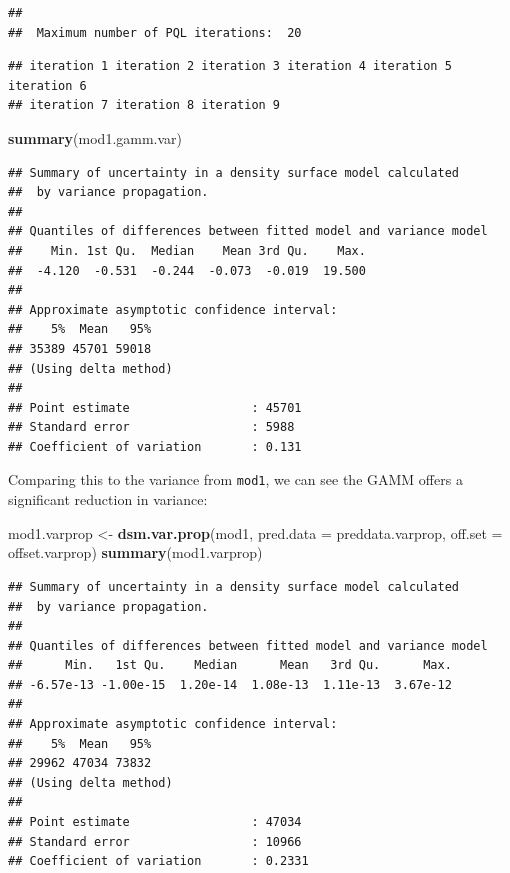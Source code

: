 \documentclass[]{amsart}
\newenvironment{Shaded}{}{}
\newcommand{\KeywordTok}[1]{\textcolor[rgb]{0.00,0.44,0.13}{\textbf{{#1}}}}
\newcommand{\DataTypeTok}[1]{\textcolor[rgb]{0.56,0.13,0.00}{{#1}}}
\newcommand{\StringTok}[1]{\textcolor[rgb]{0.25,0.44,0.63}{{#1}}}
\newcommand{\NormalTok}[1]{{#1}}
\begin{document}
\begin{verbatim}
## 
##  Maximum number of PQL iterations:  20
\end{verbatim}

\begin{verbatim}
## iteration 1 iteration 2 iteration 3 iteration 4 iteration 5 iteration 6
## iteration 7 iteration 8 iteration 9
\end{verbatim}

\begin{Shaded}
\begin{Highlighting}[]
\KeywordTok{summary}\NormalTok{(mod1.gamm.var)}
\end{Highlighting}
\end{Shaded}

\begin{verbatim}
## Summary of uncertainty in a density surface model calculated
##  by variance propagation.
## 
## Quantiles of differences between fitted model and variance model
##    Min. 1st Qu.  Median    Mean 3rd Qu.    Max. 
##  -4.120  -0.531  -0.244  -0.073  -0.019  19.500 
## 
## Approximate asymptotic confidence interval:
##    5%  Mean   95% 
## 35389 45701 59018 
## (Using delta method)
## 
## Point estimate                 : 45701 
## Standard error                 : 5988 
## Coefficient of variation       : 0.131
\end{verbatim}

Comparing this to the variance from \texttt{mod1}, we can see the GAMM
offers a significant reduction in variance:

\begin{Shaded}
\begin{Highlighting}[]
\NormalTok{mod1.varprop <-}\StringTok{ }\KeywordTok{dsm.var.prop}\NormalTok{(mod1, }\DataTypeTok{pred.data =} \NormalTok{preddata.varprop, }
    \DataTypeTok{off.set =} \NormalTok{offset.varprop)}
\KeywordTok{summary}\NormalTok{(mod1.varprop)}
\end{Highlighting}
\end{Shaded}

\begin{verbatim}
## Summary of uncertainty in a density surface model calculated
##  by variance propagation.
## 
## Quantiles of differences between fitted model and variance model
##      Min.   1st Qu.    Median      Mean   3rd Qu.      Max. 
## -6.57e-13 -1.00e-15  1.20e-14  1.08e-13  1.11e-13  3.67e-12 
## 
## Approximate asymptotic confidence interval:
##    5%  Mean   95% 
## 29962 47034 73832 
## (Using delta method)
## 
## Point estimate                 : 47034 
## Standard error                 : 10966 
## Coefficient of variation       : 0.2331
\end{verbatim}
\end{document}

